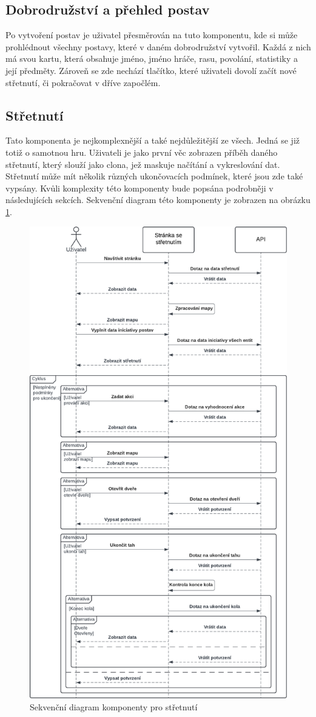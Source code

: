 \subsection{Dobrodružství a přehled postav}
Po vytvoření postav je uživatel přesměrován na tuto komponentu, kde si může prohlédnout všechny postavy, které v daném dobrodružství vytvořil. Každá z nich má svou kartu, která obsahuje jméno, jméno hráče, rasu, povolání, statistiky a její předměty. Zároveň se zde nechází tlačítko, které uživateli dovolí začít nové střetnutí, či pokračovat v dříve započlém.

\subsection{Střetnutí}
Tato komponenta je nejkomplexnější a také nejdůležitější ze všech. Jedná se již totiž o samotnou hru. Uživateli je jako první věc zobrazen příběh daného střetnutí, který slouží jako clona, jež maskuje načítání a vykreslování dat. Střetnutí může mít několik různých ukončovacích podmínek, které jsou zde také vypsány. Kvůli komplexity této komponenty bude popsána podrobněji v následujících sekcích. Sekvenční diagram této komponenty je zobrazen na obrázku \ref{fig:encounter_diagram}.

\begin{figure}[htbp]
  \centering
  \includegraphics[width=.70\textwidth]{resources/figures/encounter_diagram.pdf}
  \caption{Sekvenční diagram komponenty pro střetnutí}
  \label{fig:encounter_diagram}
\end{figure}

